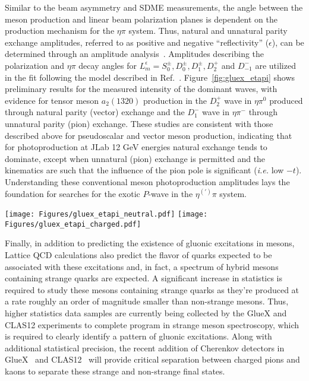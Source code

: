 Similar to the beam asymmetry and SDME measurements, the angle between the meson production and linear beam polarization planes is dependent on the production mechanism for the $\eta\pi$ system.  Thus, natural and unnatural parity exchange amplitudes, referred to as positive and negative ``reflectivity'' ($\epsilon$), can be determined through an amplitude analysis~\cite{Mathieu:2019fts}.  Amplitudes describing the polarization and $\eta\pi$ decay angles for $L_m^\epsilon = S_0^\pm, D_0^\pm, D_1^\pm, D_2^+$ and $D_{-1}^-$ are utilized in the fit following the model described in Ref.~\cite{Mathieu:2020zpm}.  Figure~\ref{fig:gluex_etapi} shows preliminary results for the measured intensity of the dominant waves, with evidence for tensor meson $a_2(1320)$ production in the $D_2^+$ wave in $\eta\pi^0$ produced through natural parity (vector) exchange and the $D_1^-$ wave in $\eta\pi^-$ through unnatural parity (pion) exchange.  These studies are consistent with those described above for pseudoscalar and vector meson production, indicating that for photoproduction at JLab 12 GeV energies natural exchange tends to dominate, except when unnatural (pion) exchange is permitted and the kinematics are such that the influence of the pion pole is significant (\textit{i.e.} low $-t$). Understanding these conventional meson photoproduction amplitudes lays the foundation for searches for the exotic $P$-wave in the $\eta^{(')}\pi$ system. 

\begin{figure*}
\begin{center}
\texttt{[image: Figures/gluex\_etapi\_neutral.pdf]}
\texttt{[image: Figures/gluex\_etapi\_charged.pdf]}
\caption{Preliminary mass spectra and amplitude analysis results from GlueX for the reactions $\gamma p \rightarrow \eta\pi^0 p$ (left) and $\gamma p \rightarrow \eta\pi^- \Delta^{++}$ (right) with $0.1 < -t < 0.3$~GeV$^2$ and $8.2 < E_\gamma < 8.8$~GeV~\cite{gluexetapihadron}.  The total measured intensity is shown in black with colored points for the dominant tensor $a_2(1320)$ amplitudes, labeled $L_m^\epsilon$.}
\label{fig:gluex_etapi}
\end{center}
\end{figure*}

Finally, in addition to predicting the existence of gluonic excitations in mesons, Lattice QCD calculations also predict the flavor of quarks expected to be associated with these excitations and, in fact, a spectrum of hybrid mesons containing strange quarks are expected.  A significant increase in statistics is required to study these mesons containing strange quarks as they're produced at a rate roughly an order of magnitude smaller than non-strange mesons.  Thus, higher statistics data samples are currently being collected by the GlueX and CLAS12 experiments to complete program in strange meson spectroscopy, which is required to clearly identify a pattern of gluonic excitations.  Along with additional statistical precision, the recent addition of Cherenkov detectors in GlueX~\cite{Ali:2020erv} and CLAS12~\cite{Contalbrigo:2020lnd} will provide critical separation between charged pions and kaons to separate these strange and non-strange final states.

